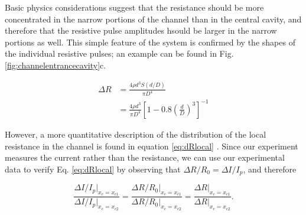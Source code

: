 			
			Basic physics considerations suggest that the resistance should be more concentrated in the narrow portions of the channel than in the central cavity, and therefore that the resistive pulse amplitudes hsould be larger in the narrow portions as well. This simple feature of the system is confirmed by the shapes of the individual resistive pulses; an example can be found in Fig. \ref{fig:channelentrancecavity}c. 
			
			\begin{equation} \label{eq:dRlocal}
				\begin{split}
					\Delta R &= \frac{4\rho d^{3}S\left(d/D\right)}{\pi D^{4}} \\
					&= \frac{4\rho d^{3}}{\pi D^{4}}\left[1-0.8\left(\frac{d}{D}\right)^{3}\right]^{-1}
				\end{split}
			\end{equation}

			
			
			However, a more quantitative description of the distribution of the local resistance in the channel is found in equation \ref{eq:dRlocal} \cite{Deblois1977}. Since our experiment measures the current rather than the resistance, we can use our experimental data to verify Eq. \ref{eq:dRlocal} by observing that $\Delta R/R_{0}=\Delta I/I_{p}$, and therefore
			
			\begin{equation} \label{eq:currentratio}
				\frac{\Delta I/I_{p}|_{x_{c}=x_{c1}}}{\Delta I/I_{p}|_{x_{c}=x_{c2}}}=\frac{\Delta R/R_{0}|_{x_{c}=x_{c1}}}{\Delta R/R_{0}|_{x_{c}=x_{c2}}}=\frac{\Delta R|_{x_{c}=x_{c1}}}{\Delta R|_{x_{c}=x_{c2}}}.
			\end{equation}
			
			
			
